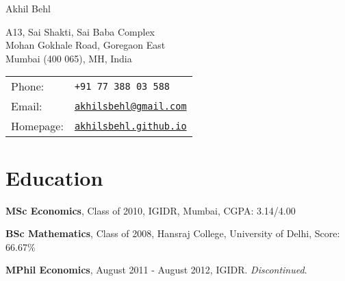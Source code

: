 \documentclass[a4paper,10pt]{article}
\def\name{Akhil Behl}
\renewenvironment{itemize}{
\begin{list}{}{
  \setlength{\leftmargin}{1.5em}
  }
  }{
\end{list}
}
\begin{document}
{\huge \name}


\vspace{0.25in}

\begin{minipage}{0.45\linewidth}
  A13, Sai Shakti, Sai Baba Complex \\
  Mohan Gokhale Road, Goregaon East \\
  Mumbai (400 065), MH, India \\
\end{minipage}
\begin{minipage}{0.45\linewidth}
  \vspace*{-\baselineskip}
  \begin{tabular}{ll}
    Phone: & \tt +91 77 388 03 588 \\
    Email: & \href{mailto:akhilsbehl@gmail.com}{\tt akhilsbehl@gmail.com} \\
    Homepage: & \href{http://akhilsbehl.github.io}{\tt akhilsbehl.github.io} \\
  \end{tabular}
\end{minipage}

\section*{Education}
\begin{itemize}
  \item \textbf{MSc Economics}, Class of 2010, IGIDR, Mumbai, CGPA:
    3.14/4.00
  \item \textbf{BSc Mathematics}, Class of 2008, Hansraj College, University of Delhi,
    Score: 66.67\%
  \item \textbf{MPhil Economics}, August 2011 - August 2012, IGIDR.
    \textit{Discontinued}.
\end{itemize}
\end{document}
